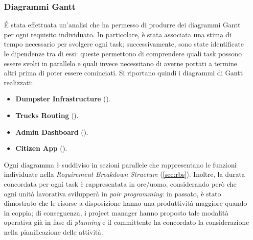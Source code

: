 \subsubsection{Diagrammi Gantt}
\'E stata effettuata un'analisi che ha permesso di produrre dei diagrammi Gantt per ogni requisito individuato. In particolare, è stata associata una stima di tempo necessario per svolgere ogni task; successivamente, sono state identificate le dipendenze tra di essi: queste permettono di comprendere quali task possono essere svolti in parallelo e quali invece necessitano di averne portati a termine altri prima di poter essere cominciati. Si riportano quindi i diagrammi di Gantt realizzati:
\begin{itemize}
    \item \textbf{Dumpster Infrastructure} ().
    \item \textbf{Trucks Routing} ().
    \item \textbf{Admin Dashboard} ().
    \item \textbf{Citizen App} ().
\end{itemize}
Ogni diagramma è suddiviso in sezioni parallele che rappresentano le funzioni individuate nella \textit{Requirement Breakdown Structure} (\ref{sec:rbs}). Inoltre, la durata concordata per ogni task è rappresentata in ore/uomo, considerando però che ogni unità lavorativa svilupperà in \textit{pair programming}: in passato, è stato dimostrato che le risorse a disposizione hanno una produttività maggiore quando in coppia; di conseguenza, i project manager hanno proposto tale modalità operativa già in fase di \textit{planning} e il committente ha concordato la considerazione nella pianificazione delle attività.
